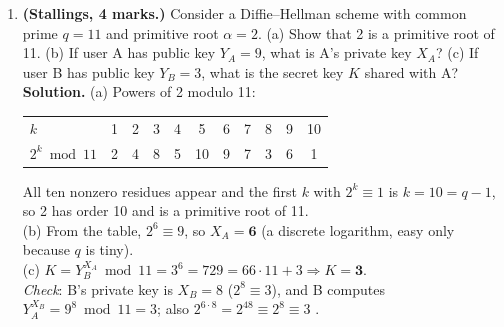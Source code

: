 \begin{enumerate}[leftmargin=1.6em,itemsep=4pt]
  \item \textbf{(Stallings, 4 marks.)} Consider a Diffie--Hellman scheme with common prime $q = 11$ and primitive root $\alpha = 2$. (a) Show that 2 is a primitive root of 11. (b) If user A has public key $Y_A = 9$, what is A's private key $X_A$? (c) If user B has public key $Y_B = 3$, what is the secret key $K$ shared with A?\\
  \textbf{Solution.} (a) Powers of 2 modulo 11:
  \begin{center}\small
  \begin{tabular}{@{}l*{10}{c}@{}}
  \toprule
  $k$ & 1 & 2 & 3 & 4 & 5 & 6 & 7 & 8 & 9 & 10\\
  $2^k \bmod 11$ & 2 & 4 & 8 & 5 & 10 & 9 & 7 & 3 & 6 & 1\\
  \bottomrule
  \end{tabular}
  \end{center}
  All ten nonzero residues appear and the first $k$ with $2^k \equiv 1$ is $k = 10 = q - 1$, so 2 has order 10 and is a primitive root of 11.\\
  (b) From the table, $2^6 \equiv 9$, so $X_A = \mathbf{6}$ (a discrete logarithm, easy only because $q$ is tiny).\\
  (c) $K = Y_B^{X_A} \bmod 11 = 3^6 = 729 = 66 \cdot 11 + 3 \Rightarrow K = \mathbf{3}$.\\
  \emph{Check}: B's private key is $X_B = 8$ ($2^8 \equiv 3$), and B computes $Y_A^{X_B} = 9^8 \bmod 11 = 3$; also $2^{6 \cdot 8} = 2^{48} \equiv 2^{8} \equiv 3$ \checkmark.


\end{enumerate}
